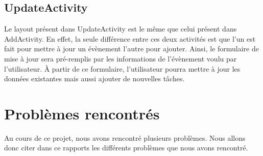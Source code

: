 \documentclass[12pt,a4paper]{report}
\begin{document}
\subsection{UpdateActivity}
\begin{flushleft}
\justify
Le layout présent dans UpdateActivity est le même que celui présent dans AddActivity. En effet, la seule différence entre ces deux activités est que l'un est fait pour mettre à jour un évènement l'autre pour ajouter. Ainsi, le formulaire de mise à jour sera pré-remplis par les informations de l'évènement voulu par l'utilisateur. \`A partir de ce formulaire, l'utilisateur pourra mettre à jour les données existantes mais aussi ajouter de nouvelles tâches.
\end{flushleft}
\section{Problèmes rencontrés}
\begin{flushleft}
\justify
Au cours de ce projet, nous avons rencontré plusieurs problèmes. Nous allons donc citer dans ce rapports les différents problèmes que nous avons rencontré.
\end{flushleft}
\end{document}
